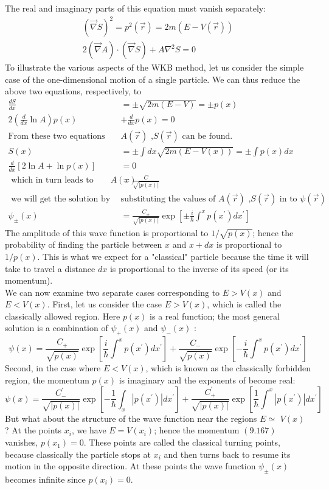 The real and imaginary parts of this equation must vanish separately:
$$
\begin{gathered}
(\vec{\nabla} S)^{2}=p^{2}(\vec{r})=2 m(E-V(\vec{r})) \\
2(\vec{\nabla} A) \cdot(\vec{\nabla} S)+A \nabla^{2} S=0
\end{gathered}
$$
To illustrate the various aspects of the WKB method, let us consider the simple case of the one-dimensional motion of a single particle. We can thus reduce the above two equations, respectively, to
	$$
	\begin{aligned}
		\frac{d S}{d x}&=\pm \sqrt{2 m(E-V)}=\pm p(x) \\
		2\left(\frac{d}{d x} \ln A\right) p(x)&+\frac{d}{d x} p(x)=0\\
	\text{From these two equations }&\text{$A(\vec{r})$ ,$S(\vec{r})$ can be found.}\\
	S(x)&=\pm \int d x \sqrt{2 m(E-V(x))}=\pm \int p(x) d x\\
	\frac{d}{d x}[2 \ln A+\ln p(x)]&=0\\
\text{	which in turn leads to}\qquad
	A(x)&=\frac{C}{\sqrt{|p(x)|}}\\
\text{	we will get the solution by }&\text{substituting the values of $A(\vec{r})$ ,$S(\vec{r})$ in to }	\psi(\vec{r})\\
	\psi_{\pm}(x)&=\frac{C_{\pm}}{\sqrt{|p(x)|}} \exp \left[\pm \frac{i}{\hbar} \int^{x} p\left(x^{\prime}\right) d x^{\prime}\right] 
\end{aligned}
$$
The amplitude of this wave function is proportional to $1 / \sqrt{p(x)}$; hence the probability of finding the particle between $x$ and $x+d x$ is proportional to $1 / p(x)$. This is what we expect for a "classical" particle because the time it will take to travel a distance $d x$ is proportional to the inverse of its speed (or its momentum).\\
 We can now examine two separate cases corresponding to $E>V(x)$ and $E<V(x)$. First, let us consider the case $E>V(x)$, which is called the classically allowed region. Here $p(x)$ is a real function; the most general solution  is a combination of $\psi_{+}(x)$ and $\psi_{-}(x)$ :
$$
\psi(x)=\frac{C_{+}}{\sqrt{p(x)}} \exp \left[\frac{i}{\hbar} \int^{x} p\left(x^{\prime}\right) d x^{\prime}\right]+\frac{C_{-}}{\sqrt{p(x)}} \exp \left[-\frac{i}{\hbar} \int^{x} p\left(x^{\prime}\right) d x^{\prime}\right]
$$
Second, in the case where $E<V(x)$, which is known as the classically forbidden region, the momentum $p(x)$ is imaginary and the exponents of become real:
$$
\psi(x)=\frac{C_{-}^{\prime}}{\sqrt{|p(x)|}} \exp \left[-\frac{1}{\hbar} \int_{x}\left|p\left(x^{\prime}\right)\right| d x^{\prime}\right]+\frac{C_{+}^{\prime}}{\sqrt{|p(x)|}} \exp \left[\frac{1}{\hbar} \int^{x}\left|p\left(x^{\prime}\right)\right| d x^{\prime}\right]
$$
But what about the structure of the wave function near the regions $E \simeq$ $V(x)$ ? At the points $x_{i}$, we have $E=V\left(x_{i}\right)$; hence the momentum $(9.167)$ vanishes, $p\left(x_{1}\right)=0$. These points are called the classical turning points, because classically the particle stops at $x_{i}$ and then turns back to resume its motion in the opposite direction. At these points the wave function $\psi_{\pm}(x)$ becomes infinite since $p\left(x_{i}\right)=0$. 
